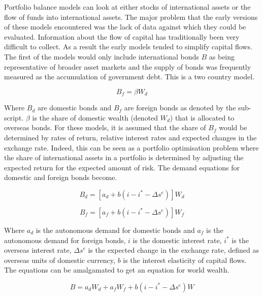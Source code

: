 \documentclass[12pt, a4paper, oneside]{article}\usepackage[]{graphicx}\usepackage[]{color}
\begin{document}

Portfolio balance models can look at either stocks of international assets or the flow of funds into international assets.   The major problem that the early versions of these models encountered was the lack of data against which they could be evaluated.   Information about the flow of capital has traditionally been very difficult to collect.  As a result the early models tended to simplify capital flows. The first of the models would only include international bonds $B$ as being representative of broader asset markets and the supply of bonds was frequently measured as the accumulation of government debt.   This is a two country model. 

\begin{equation} 
B_f=\beta W_d
\end{equation}

Where $B_d$ are domestic bonds and $B_f$ are foreign bonds as denoted by the sub-script.  $\beta$ is the share of domestic wealth (denoted $W_d$) that is allocated to overseas bonds.    For these models, it is  assumed that the share of $B_f$ would be determined by rates of return, relative interest rates and expected changes in the exchange rate\citep{Kouri1974International}.  Indeed, this can be seen as a portfolio optimisation problem where the share of international assets in a portfolio is determined by adjusting the expected return for the expected amount of risk. The demand equations for domestic and foreign bonds become. 

\begin{equation}
B_d=[a_d+b(i-i^* - \Delta s^e)]W_d
\end{equation}

\begin{equation}
B_f=[a_f+b(i-i^* - \Delta s^e)]W_f
\end{equation}  

Where $a_d$ is the autonomous demand for domestic bonds and $a_f$ is the autonomous demand for foreign bonds, $i$ is the domestic interest rate, $i^*$ is the overseas interest rate, $\Delta s^e$ is the expected change in the exchange rate, defined as overseas units of domestic currency, $b$ is the interest elasticity of capital flows.  The equations can be amalgamated to get an equation for world wealth. 

\begin{equation}
B=a_dW_d+a_fW_f+b(i-i^*-\Delta s^e)W
\end{equation}
\end{document}
